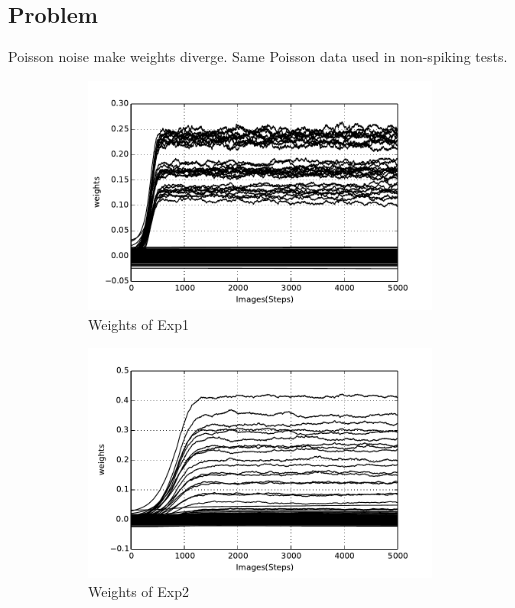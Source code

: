 	\subsection{Problem}
Poisson noise make weights diverge.
Same Poisson data used in non-spiking tests.
	\begin{figure}
		\centering
		\begin{subfigure}[t]{0.4\textwidth}
			\includegraphics[width=\textwidth]{pics_ae/exp1_weights_noisy.pdf}
			\caption{Weights of Exp1}
		\end{subfigure}
		\begin{subfigure}[t]{0.4\textwidth}
			\includegraphics[width=\textwidth]{pics_ae/exp2_weights_noisy.pdf}
			\caption{Weights of Exp2}
		\end{subfigure}
		\begin{subfigure}[t]{0.4\textwidth}

\end{subfigure}
\end{figure}
